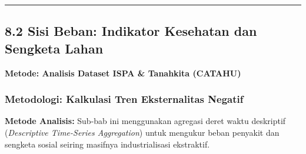\documentclass[
]{article}
\begin{document}
\begin{center}\rule{0.5\linewidth}{0.5pt}\end{center}

\subsection{8.2 Sisi Beban: Indikator Kesehatan dan Sengketa
Lahan}\label{sisi-beban-indikator-kesehatan-dan-sengketa-lahan}

\textbf{Metode: Analisis Dataset ISPA \& Tanahkita (CATAHU)}

\subsubsection{Metodologi: Kalkulasi Tren Eksternalitas
Negatif}\label{metodologi-kalkulasi-tren-eksternalitas-negatif}

\textbf{Metode Analisis:} Sub-bab ini menggunakan agregasi deret waktu
deskriptif (\emph{Descriptive Time-Series Aggregation}) untuk mengukur
beban penyakit dan sengketa sosial seiring masifnya industrialisasi
ekstraktif.
\end{document}
